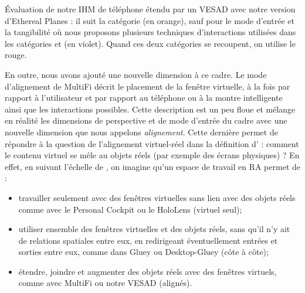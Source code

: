 {%
}{
  Évaluation de notre IHM de téléphone étendu par un VESAD avec notre version d'Ethereal Planes : il suit la catégorie  (en orange), sauf pour le mode d'entrée et la tangibilité où nous proposons plusieurs techniques d'interactions utilisées dans les catégories  et  (en violet). Quand ces deux catégories se recoupent, on utilise le rouge.
}

En outre, nous avons ajouté une nouvelle dimension à ce cadre. Le mode d'alignement de MultiFi \citep{Grubert2015} décrit le placement de la fenêtre virtuelle, à la fois par rapport à l'utilisateur et par rapport au téléphone ou à la montre intelligente ainsi que les interactions possibles. Cette description est un peu floue et mélange en réalité les dimensions de perspective et de mode d'entrée du cadre avec une nouvelle dimension que nous appelons \emph{alignement}. Cette dernière permet de répondre à la question de l'alignement virtuel-réel dans la définition d'\cite{Azuma1997} : comment le contenu virtuel se mêle au objets réels (par exemple des écrans physiques) ? En effet, en suivant l'échelle de \cite{Milgram1994}, on imagine qu'un espace de travail en RA permet de :
\begin{itemize}
  \item travailler seulement avec des fenêtres virtuelles sans lien avec des objets réels comme avec le Personal Cockpit ou le HoloLens (virtuel seul);
  \item utiliser ensemble des fenêtres virtuelles et des objets réels, sans qu'il n'y ait de relations spatiales entre eux, en redirigeant éventuellement entrées et sorties entre eux, comme dans Gluey ou Desktop-Gluey (côte à côte);
  \item étendre, joindre et augmenter des objets réels avec des fenêtres virtuels, comme avec MultiFi ou notre VESAD (alignés).
\end{itemize}
\bigskip


